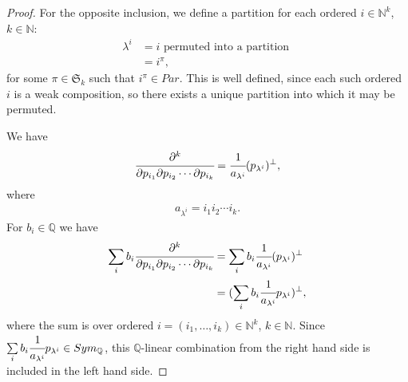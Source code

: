 \documentclass[8pt]{extarticle}
\newcommand{\N}{\mathbb{N}}
\newcommand{\Q}{\mathbb{Q}}
\newcommand{\<}{\langle}
\renewcommand{\>}{\rangle}
\theoremstyle{definition}
\begin{document}
\begin{proof}
  For the opposite inclusion, we define a partition for each ordered $i \in \N^k$, $k \in \N$:
  \begin{align*}
    \lambda^i
    &= i \text{ permuted into a partition } \\
    &= i^{\pi},
  \end{align*}
  for some $\pi \in \mathfrak{S}_k$ such that $i^{\pi} \in Par$. This is well defined, since each such ordered $i$ is a weak composition, so there exists a unique partition into which it may be permuted.

  We have
  \begin{align*}
    \cfrac{\partial^k}{\partial p_{i_1} \partial p_{i_2} \cdots \partial p_{i_k}} = \cfrac{1}{a_{\lambda^i}} (p_{\lambda^i})^{\perp},
  \end{align*}
  where
  \begin{align*}
    a_{\lambda^i} = i_1 i_2 \cdots i_k.
  \end{align*}
  For $b_{i} \in \Q$ we have
  \begin{align*}
    \sum\limits_{i} b_{i}\cfrac{\partial^k}{\partial p_{i_1} \partial p_{i_2} \cdots \partial p_{i_k}}
    &=
    \sum\limits_{i} b_{i}\cfrac{1}{a_{\lambda^i}} (p_{\lambda^i})^{\perp} \\
    &=
    (\sum\limits_{i} b_{i}\cfrac{1}{a_{\lambda^i}}p_{\lambda^i})^{\perp},
  \end{align*}
  where the sum is over ordered $i=(i_1, \dots, i_k) \in \N^k$, $k \in \N$. Since $\sum\limits_{i} b_{i}\cfrac{1}{a_{\lambda^i}}p_{\lambda^i} \in Sym_{\Q}$, this $\Q$-linear combination from the right hand side is included in the left hand side.
\end{proof}
\end{document}

